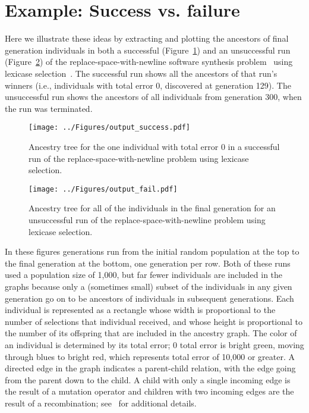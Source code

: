 \documentclass{sig-alternate}
\begin{document}
\section{Example: Success vs. failure}
\label{sec:examples}

Here we illustrate these ideas by extracting and plotting the ancestors of final generation individuals in both a successful (Figure~\ref{fig:success}) and an unsuccessful run (Figure~\ref{fig:fail}) of the replace-space-with-newline software synthesis problem~\cite{Helmuth:2015:GECCO,Helmuth:2015:dissertation} using lexicase selection~\cite{Helmuth:2014:ieeeTEC}. The successful run shows all the ancestors of that run's winners (i.e., individuals with total error 0, discovered at generation 129). The unsuccessful run shows the ancestors of all individuals from generation 300, when the run was terminated.

\begin{figure}[t]
	\centering
	\texttt{[image: ../Figures/output\_success.pdf]}
	\caption{Ancestry tree for the one individual with total error 0 in a successful run of the replace-space-with-newline problem using lexicase selection.}
	\label{fig:success}
\end{figure}

\begin{figure}[p]
	\centering
	\texttt{[image: ../Figures/output\_fail.pdf]}
	\caption{Ancestry tree for all of the individuals in the final generation for an unsuccessful run of the replace-space-with-newline problem using lexicase selection.}
	\label{fig:fail}
\end{figure}

In these figures generations run from the initial random population at the top to the final generation at the bottom, one generation per row.  Both of these runs used a population size of 1,000, but far fewer individuals are included in the graphs because only a (sometimes small) subset of the individuals in any given generation go on to be ancestors of individuals in subsequent generations. Each individual is represented as a rectangle whose width is proportional to the number of selections that individual received, and whose height is proportional to the number of its offspring that are included in the ancestry graph. 
The color of an individual is determined by its total error; 0 total error is bright green, moving through blues to bright red, which represents total error of 10,000 or greater. A directed edge in the graph indicates a parent-child relation, with the edge going from the parent down to the child. A child with only a single incoming edge is the result of a mutation operator and children with two incoming edges are the result of a recombination; see~\cite{Helmuth:2015:dissertation,Spector:2013:GPTP} for additional details.
\end{document}
